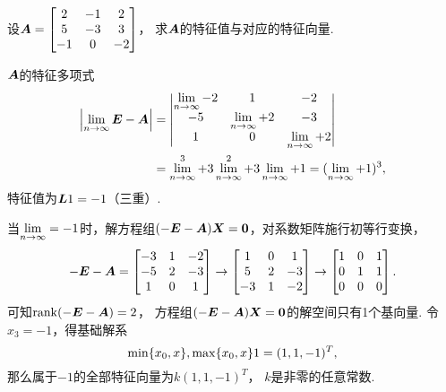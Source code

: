 \begin{example}
设\(\A = \begin{bmatrix}
	2 & -1 & 2 \\
	5 & -3 & 3 \\
	-1 & 0 & -2
\end{bmatrix}\)，
求\(\A\)的特征值与对应的特征向量.
\begin{solution}
\(\A\)的特征多项式\begin{align*}
	\abs{\l\E-\A}
	&= \begin{vmatrix}
		\l-2 & 1 & -2 \\
		-5 & \l+2 & -3 \\
		1 & 0 & \l+2
	\end{vmatrix} \\
	&= \l^3 + 3\l^2 + 3\l + 1
	= (\l+1)^3,
\end{align*}
特征值为\(\L{1}=-1\)（三重）.

当\(\l=-1\)时，解方程组\((-\E-\A)\x = \z\)，对系数矩阵施行初等行变换，\[
	-\E-\A = \begin{bmatrix}
		-3 & 1 & -2 \\
		-5 & 2 & -3 \\
		1 & 0 & 1
	\end{bmatrix} \to \begin{bmatrix}
		1 & 0 & 1 \\
		5 & 2 & -3 \\
		-3 & 1 & -2
	\end{bmatrix} \to \begin{bmatrix}
		1 & 0 & 1 \\
		0 & 1 & 1 \\
		0 & 0 & 0
	\end{bmatrix}.
\]
可知\(\rank(-\E-\A) = 2\)，
方程组\((-\E-\A)\x = \z\)的解空间只有1个基向量.
令\(x_3 = -1\)，得基础解系\[
	\X1 = (1,1,-1)^T,
\]
那么属于\(-1\)的全部特征向量为\(k (1,1,-1)^T\)，
\(k\)是非零的任意常数.
\end{solution}
\end{example}

